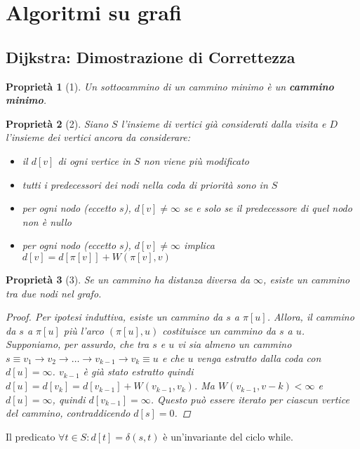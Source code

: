 \documentclass[11pt]{article}
\newtheorem*{proprietà}{Proprietà}
\begin{document}
\section*{Algoritmi su grafi}
\subsection*{Dijkstra: Dimostrazione di Correttezza}
\begin{proprietà}[1]
    Un sottocammino di un cammino minimo è un \textbf{cammino minimo}.
\end{proprietà}
\begin{proprietà}[2]
    Siano $S$ l'insieme di vertici già considerati dalla visita e $D$ l'insieme dei vertici ancora da considerare:
    \begin{itemize}
        \item[2.1.] il $d[v]$ di ogni vertice in $S$ non viene più modificato
        \item[2.2.] tutti i predecessori dei nodi nella coda di priorità sono in $S$
        \item[2.3.] per ogni nodo (eccetto $s$), $d[v]\neq \infty$ se e solo se il predecessore di quel nodo non è nullo 
        \item[2.4.] per ogni nodo (eccetto $s$), $d[v]\neq \infty$ implica $d[v]=d[\pi[v]]+W(\pi[v],v)$
    \end{itemize}
\end{proprietà}
\begin{proprietà}[3]
    Se un cammino ha distanza diversa da $\infty$, esiste un cammino tra due nodi nel grafo.
    \begin{proof}
        Per ipotesi induttiva, esiste un cammino da $s$ a $\pi[u]$. Allora, il cammino da $s$ a $\pi[u]$ più l'arco 
        $(\pi[u],u)$ costituisce un cammino da $s$ a $u$.\\
        Supponiamo, per assurdo, che tra $s$ e $u$ vi sia almeno un cammino $s\equiv v_1\rightarrow v_2 \rightarrow \dots \rightarrow v_{k-1} \rightarrow v_k \equiv u$
        e che $u$ venga estratto dalla coda con $d[u]=\infty$. $v_{k-1}$ è già stato estratto quindi 
        $d[u]=d[v_k]=d[v_{k-1}]+W(v_{k-1},v_k)$. Ma $W(v_{k-1},v-k)<\infty$ e $d[u]=\infty$, quindi $d[v_{k-1}]=\infty$.
        Questo può essere iterato per ciascun vertice del cammino, contraddicendo $d[s]=0$.
    \end{proof}
\end{proprietà}
Il predicato $\forall t \in S : d[t]=\delta(s,t)$ è un'invariante del ciclo while.
\end{document}
